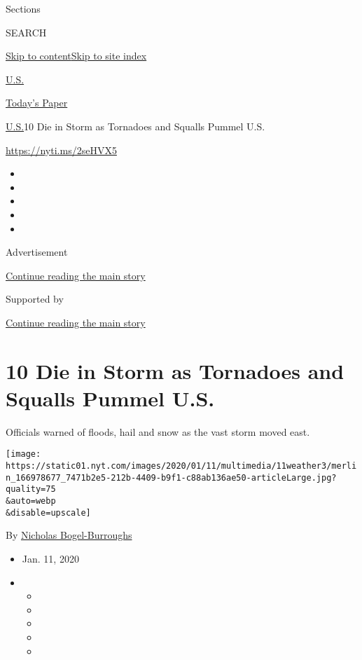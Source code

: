 Sections

SEARCH

\protect\hyperlink{site-content}{Skip to
content}\protect\hyperlink{site-index}{Skip to site index}

\href{https://www.nytimes.com/section/us}{U.S.}

\href{https://myaccount.nytimes.com/auth/login?response_type=cookie\&client_id=vi}{}

\href{https://www.nytimes.com/section/todayspaper}{Today's Paper}

\href{/section/us}{U.S.}\textbar{}10 Die in Storm as Tornadoes and
Squalls Pummel U.S.

\url{https://nyti.ms/2seHVX5}

\begin{itemize}
\item
\item
\item
\item
\item
\end{itemize}

Advertisement

\protect\hyperlink{after-top}{Continue reading the main story}

Supported by

\protect\hyperlink{after-sponsor}{Continue reading the main story}

\hypertarget{10-die-in-storm-as-tornadoes-and-squalls-pummel-us}{%
\section{10 Die in Storm as Tornadoes and Squalls Pummel
U.S.}\label{10-die-in-storm-as-tornadoes-and-squalls-pummel-us}}

Officials warned of floods, hail and snow as the vast storm moved east.

\texttt{[image: https://static01.nyt.com/images/2020/01/11/multimedia/11weather3/merlin\_166978677\_7471b2e5-212b-4409-b9f1-c88ab136ae50-articleLarge.jpg?quality=75\\\&auto=webp\\\&disable=upscale]}

By \href{https://www.nytimes.com/by/nicholas-bogel-burroughs}{Nicholas
Bogel-Burroughs}

\begin{itemize}
\item
  Jan. 11, 2020
\item
  \begin{itemize}
  \item
  \item
  \item
  \item
  \item
  \end{itemize}
\end{itemize}

